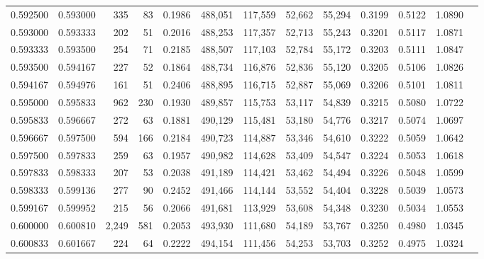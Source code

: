 \begin{tabular}{rrrrrrrrrrrrr}
0.592500 & 0.593000 &   335 &  83 &                                     0.1986 & 488,051 & 117,559 &  52,662 &  55,294 & 0.3199 & 0.5122 & 1.0890 \\
0.593000 & 0.593333 &   202 &  51 &                                     0.2016 & 488,253 & 117,357 &  52,713 &  55,243 & 0.3201 & 0.5117 & 1.0871 \\
0.593333 & 0.593500 &   254 &  71 &                                     0.2185 & 488,507 & 117,103 &  52,784 &  55,172 & 0.3203 & 0.5111 & 1.0847 \\
0.593500 & 0.594167 &   227 &  52 &                                     0.1864 & 488,734 & 116,876 &  52,836 &  55,120 & 0.3205 & 0.5106 & 1.0826 \\
0.594167 & 0.594976 &   161 &  51 &                                     0.2406 & 488,895 & 116,715 &  52,887 &  55,069 & 0.3206 & 0.5101 & 1.0811 \\
0.595000 & 0.595833 &   962 & 230 &                                     0.1930 & 489,857 & 115,753 &  53,117 &  54,839 & 0.3215 & 0.5080 & 1.0722 \\
0.595833 & 0.596667 &   272 &  63 &                                     0.1881 & 490,129 & 115,481 &  53,180 &  54,776 & 0.3217 & 0.5074 & 1.0697 \\
0.596667 & 0.597500 &   594 & 166 &                                     0.2184 & 490,723 & 114,887 &  53,346 &  54,610 & 0.3222 & 0.5059 & 1.0642 \\
0.597500 & 0.597833 &   259 &  63 &                                     0.1957 & 490,982 & 114,628 &  53,409 &  54,547 & 0.3224 & 0.5053 & 1.0618 \\
0.597833 & 0.598333 &   207 &  53 &                                     0.2038 & 491,189 & 114,421 &  53,462 &  54,494 & 0.3226 & 0.5048 & 1.0599 \\
0.598333 & 0.599136 &   277 &  90 &                                     0.2452 & 491,466 & 114,144 &  53,552 &  54,404 & 0.3228 & 0.5039 & 1.0573 \\
0.599167 & 0.599952 &   215 &  56 &                                     0.2066 & 491,681 & 113,929 &  53,608 &  54,348 & 0.3230 & 0.5034 & 1.0553 \\
0.600000 & 0.600810 & 2,249 & 581 &                                     0.2053 & 493,930 & 111,680 &  54,189 &  53,767 & 0.3250 & 0.4980 & 1.0345 \\
0.600833 & 0.601667 &   224 &  64 &                                     0.2222 & 494,154 & 111,456 &  54,253 &  53,703 & 0.3252 & 0.4975 & 1.0324 \\

\end{tabular}
